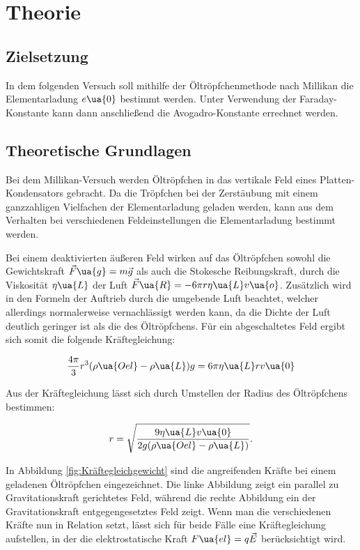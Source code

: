 \section{Theorie}

\subsection{Zielsetzung}

In dem folgenden Versuch soll mithilfe der Öltröpfchenmethode nach Millikan
die Elementarladung $e\ua{0}$ bestimmt werden. Unter Verwendung der Faraday-Konstante
kann dann anschließend die Avogadro-Konstante errechnet werden.

\subsection{Theoretische Grundlagen}

Bei dem Millikan-Versuch werden Öltröpfchen in das vertikale Feld eines Platten-Kondensators
gebracht. Da die Tröpfchen bei der Zerstäubung mit einem ganzzahligen Vielfachen
der Elementarladung geladen werden, kann aus dem Verhalten bei verschiedenen
Feldeinstellungen die Elementarladung bestimmt werden.

Bei einem deaktivierten äußeren Feld wirken auf das Öltröpfchen sowohl die
Gewichtskraft $\vec{F}\ua{g} = m \vec{g}$ als auch die Stokesche Reibungskraft, durch die
Viskosität $\eta\ua{L}$ der Luft $\vec{F}\ua{R} = -6\pi r\eta\ua{L} v\ua{o}$.
Zusätzlich wird in den Formeln der Auftrieb durch die umgebende Luft beachtet,
welcher allerdings normalerweise vernachlässigt werden kann, da die Dichte der
Luft deutlich geringer ist als die des Öltröpfchens. Für ein abgeschaltetes Feld
ergibt sich somit die folgende Kräftegleichung:

\begin{equation}
  \frac{4\pi}{3}r^3(\rho\ua{Oel}-\rho\ua{L})g = 6\pi\eta\ua{L}rv\ua{0}
  \label{eqn:Kräftegleichung_Ohne}
\end{equation}

Aus der Kräftegleichung lässt sich durch Umstellen der Radius des
Öltröpfchens bestimmen:

\begin{equation}
  r = \sqrt{ \frac{9\eta\ua{L}v\ua{0}}{2g(\rho\ua{Oel}-\rho\ua{L})}}.
  \label{eqn:Radius_Ohne}
\end{equation}

In Abbildung \ref{fig:Kräftegleichgewicht} sind die angreifenden Kräfte bei einem
geladenen Öltröpfchen eingezeichnet. Die linke Abbildung zeigt ein parallel zu
Gravitationskraft gerichtetes Feld, während die rechte Abbildung ein der
Gravitationskraft entgegengesetztes Feld zeigt. Wenn man die verschiedenen
Kräfte nun in Relation setzt, lässt sich für beide Fälle eine Kräftegleichung
aufstellen, in der die elektrostatische Kraft $F\ua{el} = q \vec{E}$ berücksichtigt
wird.

